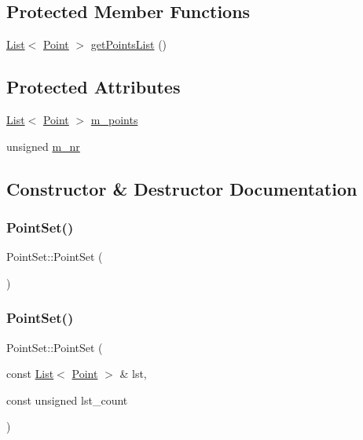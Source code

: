 \subsection*{Protected Member Functions}
\begin{DoxyCompactItemize}
\item 
\hyperlink{class_list}{List}$<$ \hyperlink{class_point}{Point} $>$ \hyperlink{class_point_set_adef0a6be759d34e965aecb153a3e4b24}{get\+Points\+List} ()
\end{DoxyCompactItemize}
\subsection*{Protected Attributes}
\begin{DoxyCompactItemize}
\item 
\hyperlink{class_list}{List}$<$ \hyperlink{class_point}{Point} $>$ \hyperlink{class_point_set_a535724e3e1ffabf8d26009e555c32b21}{m\+\_\+points}
\item 
unsigned \hyperlink{class_point_set_ae2ba098c7108eb3ae954ca7d89a710f3}{m\+\_\+nr}
\end{DoxyCompactItemize}


\subsection{Constructor \& Destructor Documentation}
\mbox{\label{class_point_set_a0795eb5d1a45f7a5f3bc643f3866eb9f}} 
\subsubsection{\texorpdfstring{Point\+Set()}{PointSet()}\hspace{0.1cm}{\footnotesize\ttfamily [1/2]}}
{\footnotesize\ttfamily Point\+Set\+::\+Point\+Set (\begin{DoxyParamCaption}{ }\end{DoxyParamCaption})}

\mbox{\label{class_point_set_ab50e8620e72c110c28bcdb9de78fcba2}} 
\subsubsection{\texorpdfstring{Point\+Set()}{PointSet()}\hspace{0.1cm}{\footnotesize\ttfamily [2/2]}}
{\footnotesize\ttfamily Point\+Set\+::\+Point\+Set (\begin{DoxyParamCaption}\item[{const \hyperlink{class_list}{List}$<$ \hyperlink{class_point}{Point} $>$ \&}]{lst,  }\item[{const unsigned}]{lst\+\_\+count }\end{DoxyParamCaption})}

